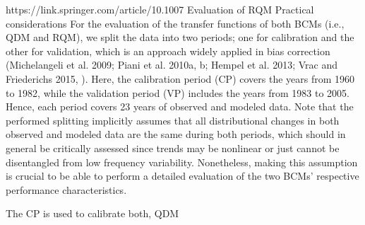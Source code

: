 https://link.springer.com/article/10.1007%
Evaluation of RQM
Practical considerations
For the evaluation of the transfer functions of both BCMs (i.e., QDM and RQM), we split the data into two periods; one for calibration and the other for validation, which is an approach widely applied in bias correction (Michelangeli et al. 2009; Piani et al. 2010a, b; Hempel et al. 2013; Vrac and Friederichs 2015, ). Here, the calibration period (CP) covers the years from 1960 to 1982, while the validation period (VP) includes the years from 1983 to 2005. Hence, each period covers 23 years of observed and modeled data. Note that the performed splitting implicitly assumes that all distributional changes in both observed and modeled data are the same during both periods, which should in general be critically assessed since trends may be nonlinear or just cannot be disentangled from low frequency variability. Nonetheless, making this assumption is crucial to be able to perform a detailed evaluation of the two BCMs’ respective performance characteristics.

The CP is used to calibrate both, QDM 